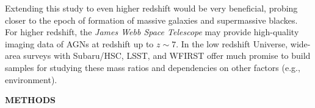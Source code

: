 \documentclass{natureprintstyle}
\newcommand{\hst}{{\it HST}}
\newcommand{\mbh}{$\mathcal M_{\rm BH}$}
\newcommand{\lhost}{$L_{\rm host}$}
\newcommand{\mstar}{{$M_*$}}
\begin{document}
Extending this study to even higher redshift would be very beneficial, probing closer to the epoch of formation of massive galaxies and supermassive blackes. For higher redshift, the {\it James Webb Space Telescope} may provide high-quality imaging data of AGNs at redshift up to $z\sim7$. In the low redshift Universe, wide-area surveys with Subaru/HSC, LSST, and WFIRST offer much promise to build samples for studying these mass ratios and dependencies on other factors (e.g., environment).





\begin{center}
{\bf \Large \uppercase{Methods} }
\end{center}
\end{document}
